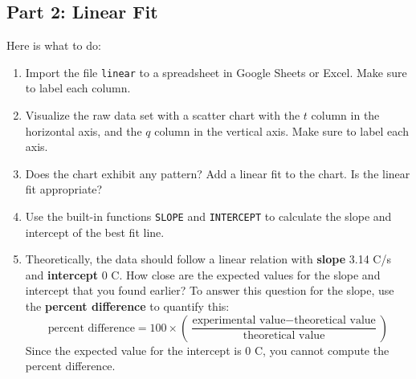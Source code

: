\subsection{Part 2: Linear Fit}
%
Here is what to do:
\begin{enumerate}
    \item Import the file \texttt{linear} to a spreadsheet in Google Sheets or Excel. Make sure to label each column.
    \item Visualize the raw data set with a scatter chart with the $t$ column in the horizontal axis, and the $q$ column in the vertical axis. Make sure to label each axis.
    \item Does the chart exhibit any pattern? Add a linear fit to the chart. Is the linear fit appropriate?
    \item Use the built-in functions \texttt{SLOPE} and \texttt{INTERCEPT} to calculate the slope and intercept of the best fit line.
    \item Theoretically, the data should follow a linear relation with \textbf{slope} 3.14 C/s and \textbf{intercept} 0 C. How close are the expected values for the slope and intercept that you found earlier? To answer this question for the slope, use the \textbf{percent difference} to quantify this:
    \begin{equation}
        \text{percent difference} = 100 \times \left(\frac{\text{experimental value} - \text{theoretical value}}{\text{theoretical value}}\right)
    \end{equation}
    Since the expected value for the intercept is 0 C, you cannot compute the percent difference.
\end{enumerate}
%
